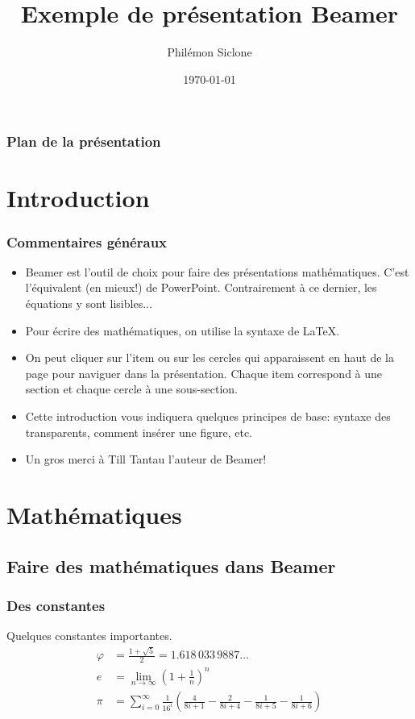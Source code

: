 \documentclass{beamer}
\title{Exemple de présentation Beamer}
\author{Philémon Siclone}
\institute{Département de mathématiques et de statistique (DMS)\\
http://www.mat.ulaval.ca
}
\date{\today}
\begin{document}
\begin{frame}
\titlepage
\end{frame}

\begin{frame}
\frametitle{Plan de la présentation}
\tableofcontents
\end{frame}

\section{Introduction}
\begin{frame}
\frametitle{Commentaires généraux}
\begin{itemize}
 \item Beamer est l'outil de choix pour faire des présentations mathématiques.
        C'est l'équivalent (\alert{en mieux!}) de PowerPoint. Contrairement à ce dernier,
        les équations y sont lisibles...
 \item Pour écrire des mathématiques, on utilise la syntaxe de \LaTeX.
 \item On peut cliquer sur l'item ou sur les cercles qui apparaissent en haut de
        la page pour naviguer dans la présentation. Chaque item correspond à une section
        et chaque cercle à une sous-section.
 \item Cette introduction vous indiquera quelques principes de base: syntaxe des transparents,
       comment insérer une figure, etc.
 \item Un gros merci à \alert{Till Tantau} l'auteur de Beamer!
\end{itemize}
\end{frame}

\section{Mathématiques}
\subsection{Faire des mathématiques dans Beamer}
\begin{frame}
\frametitle{Des constantes}
Quelques constantes importantes.
\begin{align*}
\varphi &= \frac{1+\sqrt{5}}{2} = 1.618\,033\,9887\ldots \\[0.5cm]
e &= \lim_{n\to\infty} \left( 1 + \frac{1}{n} \right)^n \\[0.5cm]
\pi &= \sum_{i=0}^{\infty} \frac{1}{16^i}
      \left( \frac{4}{8i+1} - \frac{2}{8i+4}
    - \frac{1}{8i+5} - \frac{1}{8i+6} \right)
\end{align*}
\end{frame}
\end{document}
